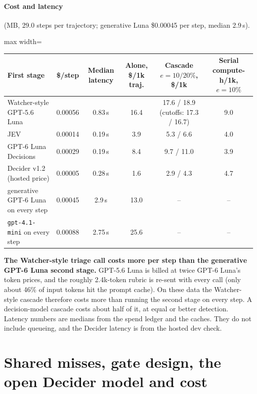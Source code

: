 \documentclass[11pt]{article}
\begin{document}
\paragraph{Cost and latency} (MB, 29.0 steps per trajectory; generative Luna \$0.00045 per step, median 2.9\,s).
\begin{center}\small
\begin{adjustbox}{max width=\linewidth}
\begin{tabular}{@{}lccccc@{}}
\toprule
First stage & \$/step & Median latency & Alone, \$/1k traj. & Cascade $e=10/20\%$, \$/1k & Serial compute-h/1k, $e=10\%$\\
\midrule
Watcher-style GPT-5.6 Luna & 0.00056 & 0.83\,s & 16.4 & 17.6 / 18.9 (cutoffs: 17.3 / 16.7) & 9.0\\
JEV & 0.00014 & 0.19\,s & 3.9 & 5.3 / 6.6 & 4.0\\
GPT-6 Luna Decisions & 0.00029 & 0.19\,s & 8.4 & 9.7 / 11.0 & 3.9\\
Decider v1.2 (hosted price) & 0.00005 & 0.28\,s & 1.6 & 2.9 / 4.3 & 4.7\\
\midrule
generative GPT-6 Luna on every step & 0.00045 & 2.9\,s & 13.0 & -- & --\\
\texttt{gpt-4.1-mini} on every step & 0.00088 & 2.75\,s & 25.6 & -- & --\\
\bottomrule
\end{tabular}
\end{adjustbox}
\end{center}
\textbf{The Watcher-style triage call costs more per step than the generative GPT-6 Luna second stage.} GPT-5.6 Luna is billed at twice GPT-6 Luna's token prices, and the roughly 2.4k-token rubric is re-sent with every call (only about 46\% of input tokens hit the prompt cache). On these data the Watcher-style cascade therefore costs more than running the second stage on every step. A decision-model cascade costs about half of it, at equal or better detection. Latency numbers are medians from the spend ledger and the caches. They do not include queueing, and the Decider latency is from the hosted dev check.

\section{Shared misses, gate design, the open Decider model and cost}\label{sec:more}
\end{document}
